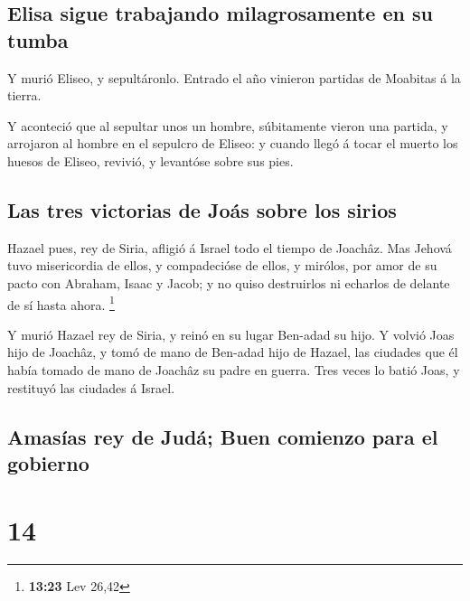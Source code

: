 \hypertarget{elisa-sigue-trabajando-milagrosamente-en-su-tumba}{%
\subsection{Elisa sigue trabajando milagrosamente en su
tumba}\label{elisa-sigue-trabajando-milagrosamente-en-su-tumba}}

 Y murió Eliseo, y sepultáronlo. Entrado el año vinieron
partidas de Moabitas á la tierra.

 Y aconteció que al sepultar unos un hombre, súbitamente
vieron una partida, y arrojaron al hombre en el sepulcro de Eliseo: y
cuando llegó á tocar el muerto los huesos de Eliseo, revivió, y
levantóse sobre sus pies.

\hypertarget{las-tres-victorias-de-jouxe1s-sobre-los-sirios}{%
\subsection{Las tres victorias de Joás sobre los
sirios}\label{las-tres-victorias-de-jouxe1s-sobre-los-sirios}}

 Hazael pues, rey de Siria, afligió á Israel todo el
tiempo de Joachâz.  Mas Jehová tuvo misericordia de
ellos, y compadecióse de ellos, y mirólos, por amor de su pacto con
Abraham, Isaac y Jacob; y no quiso destruirlos ni echarlos de delante de
sí hasta ahora. \footnote{\textbf{13:23} Lev 26,42}

 Y murió Hazael rey de Siria, y reinó en su lugar
Ben-adad su hijo.  Y volvió Joas hijo de Joachâz, y tomó
de mano de Ben-adad hijo de Hazael, las ciudades que él había tomado de
mano de Joachâz su padre en guerra. Tres veces lo batió Joas, y
restituyó las ciudades á Israel.

\hypertarget{amasuxedas-rey-de-juduxe1-buen-comienzo-para-el-gobierno}{%
\subsection{Amasías rey de Judá; Buen comienzo para el
gobierno}\label{amasuxedas-rey-de-juduxe1-buen-comienzo-para-el-gobierno}}

\hypertarget{section-13}{%
\section{14}\label{section-13}}

